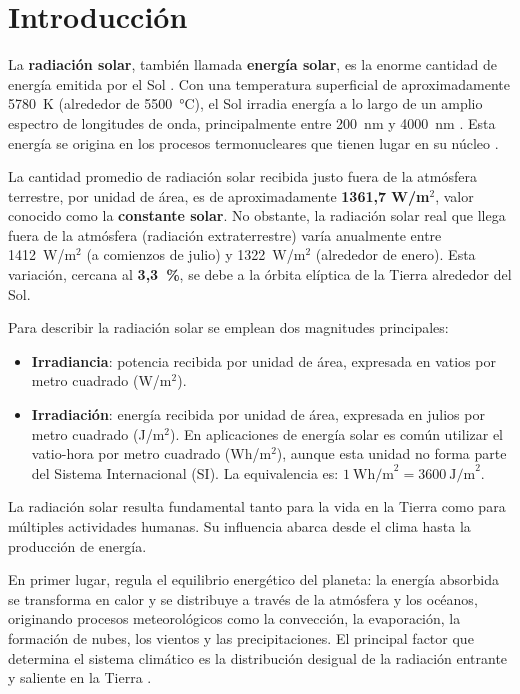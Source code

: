 \rhead{\newtitle}
\cfoot{\thepage}
\renewcommand{\headrulewidth}{1pt}
\renewcommand{\footrulewidth}{1pt}

\chapter{Introducción}\label{ch_1}

La \textbf{radiación solar}, también llamada \textbf{energía solar}, es la enorme cantidad de energía emitida por el Sol \citep{Wald2007, Wald2021}. Con una temperatura superficial de aproximadamente 5780~K (alrededor de 5500~°C), el Sol irradia energía a lo largo de un amplio espectro de longitudes de onda, principalmente entre 200~nm y 4000~nm \citep{Wald2021}. Esta energía se origina en los procesos termonucleares que tienen lugar en su núcleo \citep{Wald2021}.  

La cantidad promedio de radiación solar recibida justo fuera de la atmósfera terrestre, por unidad de área, es de aproximadamente \textbf{1361,7 W/m$^2$}, valor conocido como la \textbf{constante solar}. No obstante, la radiación solar real que llega fuera de la atmósfera (radiación extraterrestre) varía anualmente entre 1412~W/m$^2$ (a comienzos de julio) y 1322~W/m$^2$ (alrededor de enero). Esta variación, cercana al \textbf{3,3~\%}, se debe a la órbita elíptica de la Tierra alrededor del Sol.  

Para describir la radiación solar se emplean dos magnitudes principales:  
\begin{itemize}
    \item \textbf{Irradiancia}: potencia recibida por unidad de área, expresada en vatios por metro cuadrado (W/m$^2$).  
    \item \textbf{Irradiación}: energía recibida por unidad de área, expresada en julios por metro cuadrado (J/m$^2$). En aplicaciones de energía solar es común utilizar el vatio-hora por metro cuadrado (Wh/m$^2$), aunque esta unidad no forma parte del Sistema Internacional (SI). La equivalencia es: $1 \ \text{Wh/m}^2 = 3600 \ \text{J/m}^2$.  
\end{itemize}  

La radiación solar resulta fundamental tanto para la vida en la Tierra como para múltiples actividades humanas. Su influencia abarca desde el clima hasta la producción de energía.  

En primer lugar, regula el equilibrio energético del planeta: la energía absorbida se transforma en calor y se distribuye a través de la atmósfera y los océanos, originando procesos meteorológicos como la convección, la evaporación, la formación de nubes, los vientos y las precipitaciones. El principal factor que determina el sistema climático es la distribución desigual de la radiación entrante y saliente en la Tierra \citep{Trenberth2004, Haigh2015, Gray2010}.  

